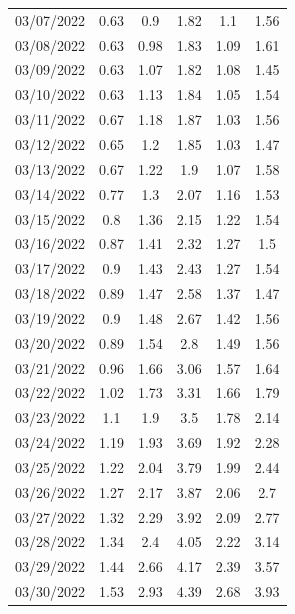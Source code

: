 \documentclass[withoutpreface,bwprint]{cumcmthesis} %
\begin{document}
\begin{appendices}
\begin{table}[]
\begin{tabular}{cccccc}
03/07/2022 & 0.63  & 0.9      & 1.82      & 1.1    & 1.56          \\
03/08/2022 & 0.63  & 0.98     & 1.83      & 1.09   & 1.61          \\
03/09/2022 & 0.63  & 1.07     & 1.82      & 1.08   & 1.45          \\
03/10/2022 & 0.63  & 1.13     & 1.84      & 1.05   & 1.54          \\
03/11/2022 & 0.67  & 1.18     & 1.87      & 1.03   & 1.56          \\
03/12/2022 & 0.65  & 1.2      & 1.85      & 1.03   & 1.47          \\
03/13/2022 & 0.67  & 1.22     & 1.9       & 1.07   & 1.58          \\
03/14/2022 & 0.77  & 1.3      & 2.07      & 1.16   & 1.53          \\
03/15/2022 & 0.8   & 1.36     & 2.15      & 1.22   & 1.54          \\
03/16/2022 & 0.87  & 1.41     & 2.32      & 1.27   & 1.5           \\
03/17/2022 & 0.9   & 1.43     & 2.43      & 1.27   & 1.54          \\
03/18/2022 & 0.89  & 1.47     & 2.58      & 1.37   & 1.47          \\
03/19/2022 & 0.9   & 1.48     & 2.67      & 1.42   & 1.56          \\
03/20/2022 & 0.89  & 1.54     & 2.8       & 1.49   & 1.56          \\
03/21/2022 & 0.96  & 1.66     & 3.06      & 1.57   & 1.64          \\
03/22/2022 & 1.02  & 1.73     & 3.31      & 1.66   & 1.79          \\
03/23/2022 & 1.1   & 1.9      & 3.5       & 1.78   & 2.14          \\
03/24/2022 & 1.19  & 1.93     & 3.69      & 1.92   & 2.28          \\
03/25/2022 & 1.22  & 2.04     & 3.79      & 1.99   & 2.44          \\
03/26/2022 & 1.27  & 2.17     & 3.87      & 2.06   & 2.7           \\
03/27/2022 & 1.32  & 2.29     & 3.92      & 2.09   & 2.77          \\
03/28/2022 & 1.34  & 2.4      & 4.05      & 2.22   & 3.14          \\
03/29/2022 & 1.44  & 2.66     & 4.17      & 2.39   & 3.57          \\
03/30/2022 & 1.53  & 2.93     & 4.39      & 2.68   & 3.93          \\

\end{tabular}
\end{table}
\end{appendices}
\end{document}
